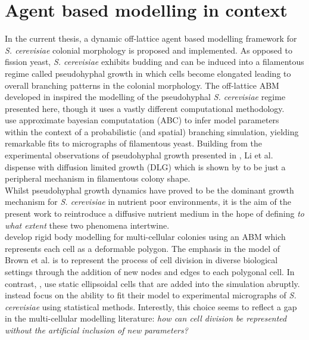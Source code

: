 \section{Agent based modelling in context}
In the current thesis, a dynamic off-lattice agent based modelling framework for \textit{S. cerevisiae} 
colonial morphology 
is proposed and implemented. As opposed to fission yeast, \textit{S. cerevisiae} exhibits 
budding and can be induced into a filamentous regime called pseudohyphal growth
in which cells become elongated leading to overall branching patterns 
in the colonial morphology. The off-lattice ABM developed in \cite{li2024off} 
inspired the modelling of the pseudohyphal \textit{S. cerevisiae} regime 
presented here, though it uses a vastly different computational methodology.
\\

\cite{li2024off} use approximate bayesian computatation (ABC)
to infer model parameters within the context of a probabilistic (and spatial) branching simulation, 
yielding remarkable fits to micrographs of filamentous yeast. Building 
from the experimental observations of pseudohyphal growth presented in 
\cite{gimeno1992unipolar}, Li et al. dispense with diffusion limited growth (DLG) which is
shown by \cite{tronnolone2018diffusion} to be just a peripheral mechanism in filamentous 
colony shape.
\\

Whilst pseudohyphal growth dynamics
have proved to be the dominant growth mechanism \cite{tronnolone2018diffusion} for 
\textit{S. cerevisiae} in nutrient poor environments, it is the aim of the present 
work to reintroduce a diffusive nutrient medium in the hope of defining 
\textit{to what extent} these two phenomena intertwine.
\\

\cite{brown2021rigid} develop rigid body modelling for multi-cellular colonies using 
an ABM which represents each cell as a deformable polygon. The emphasis in the model 
of Brown et al. is to represent the process of cell division in diverse biological 
settings through the addition of new nodes and edges to each polygonal cell. 
In contrast, \cite{li2024off}, use static ellipsoidal cells that are added into the simulation
abruptly. \cite{li2024off} instead focus on the ability to fit their model 
to experimental micrographs of \textit{S. cerevisiae} using statistical methods.
Interestly, this choice seems to reflect a gap in the multi-cellular modelling literature:
\textit{how can cell division be represented without the artificial inclusion of new parameters?}
\\

